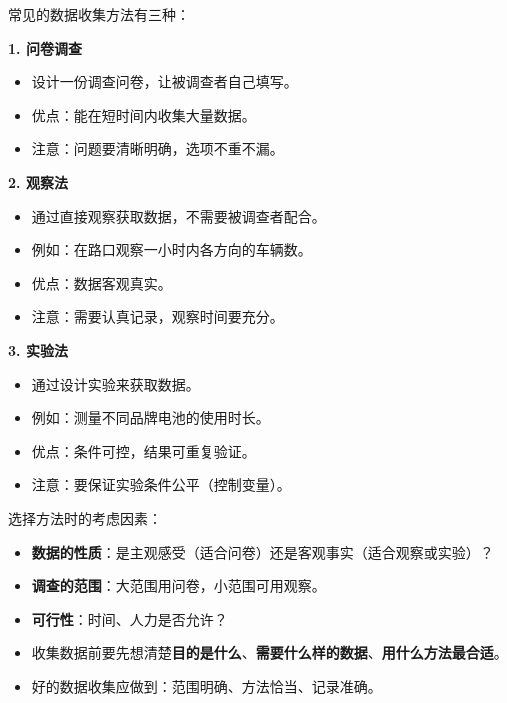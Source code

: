 \begin{understand}


常见的数据收集方法有三种：

\textbf{1. 问卷调查}
\begin{itemize}
  \item 设计一份调查问卷，让被调查者自己填写。
  \item 优点：能在短时间内收集大量数据。
  \item 注意：问题要清晰明确，选项不重不漏。
\end{itemize}


\textbf{2. 观察法}
\begin{itemize}
  \item 通过直接观察获取数据，不需要被调查者配合。
  \item 例如：在路口观察一小时内各方向的车辆数。
  \item 优点：数据客观真实。
  \item 注意：需要认真记录，观察时间要充分。
\end{itemize}


\textbf{3. 实验法}
\begin{itemize}
  \item 通过设计实验来获取数据。
  \item 例如：测量不同品牌电池的使用时长。
  \item 优点：条件可控，结果可重复验证。
  \item 注意：要保证实验条件公平（控制变量）。
\end{itemize}


选择方法时的考虑因素：
\begin{itemize}
  \item \textbf{数据的性质}：是主观感受（适合问卷）还是客观事实（适合观察或实验）？
  \item \textbf{调查的范围}：大范围用问卷，小范围可用观察。
  \item \textbf{可行性}：时间、人力是否允许？
\end{itemize}


\end{understand}

\begin{keytakeaway}


\begin{itemize}
  \item 收集数据前要先想清楚\textbf{目的是什么}、\textbf{需要什么样的数据}、\textbf{用什么方法最合适}。
  \item 好的数据收集应做到：范围明确、方法恰当、记录准确。
\end{itemize}


\end{keytakeaway}



